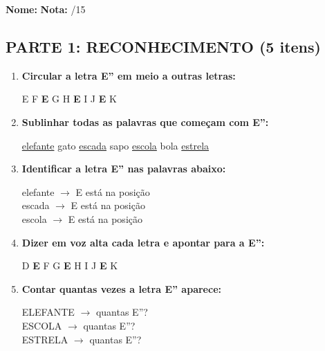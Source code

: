\begin{exercicio}

\noindent\textbf{Nome:} \underline{\hspace{4cm}} \quad \textbf{Nota:} \underline{\hspace{1cm}}/15

\subsection*{PARTE 1: RECONHECIMENTO (5 itens)}

\begin{enumerate}
  \item \textbf{Circular a letra E'' em meio a outras letras:}
  \begin{center}
  E \quad F \quad \textbf{E} \quad G \quad H \quad \textbf{E} \quad I \quad J \quad \textbf{E} \quad K
  \end{center}

  \item \textbf{Sublinhar todas as palavras que começam com E'':}
  \begin{center}
  \uline{elefante} \quad gato \quad \uline{escada} \quad sapo \quad \uline{escola} \quad bola \quad \uline{estrela}
  \end{center}

  \item \textbf{Identificar a letra E'' nas palavras abaixo:}
  \begin{center}
  elefante $\rightarrow$ E está na posição \underline{\hspace{1cm}} \\
  escada $\rightarrow$ E está na posição \underline{\hspace{1cm}} \\
  escola $\rightarrow$ E está na posição \underline{\hspace{1cm}}
  \end{center}

  \item \textbf{Dizer em voz alta cada letra e apontar para a E'':}
  \begin{center}
  D \quad \textbf{E} \quad F \quad G \quad \textbf{E} \quad H \quad I \quad J \quad \textbf{E} \quad K
  \end{center}

  \item \textbf{Contar quantas vezes a letra E'' aparece:}
  \begin{center}
  ELEFANTE $\rightarrow$ quantas E''? \underline{\hspace{1cm}} \\
  ESCOLA $\rightarrow$ quantas E''? \underline{\hspace{1cm}} \\
  ESTRELA $\rightarrow$ quantas E''? \underline{\hspace{1cm}}
  \end{center}
\end{enumerate}


\end{exercicio}
